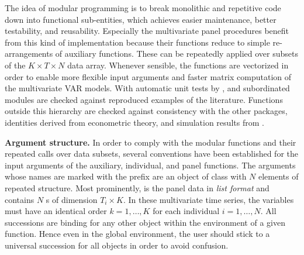 The idea of modular programming is to break monolithic and repetitive code down into functional sub-entities, which achieves easier maintenance, better testability, and reusability. Especially the multivariate panel procedures benefit from this kind of implementation because their functions reduce to simple re-arrangements of auxiliary functions. These can be repeatedly applied over subsets of the $ K \times T \times N $ data array. Whenever sensible, the  functions are vectorized in order to enable more flexible input arguments and faster matrix computation of the multivariate VAR models. With automatic unit tests by  \citep{Hadley2011}, \mbox{} and subordinated modules are checked against reproduced examples of the literature. Functions outside this hierarchy are checked against consistency with the other  packages, identities derived from econometric theory, and simulation results from \citet{EmptingEtAl2026}.


\textbf{Argument structure.} In order to comply with the modular functions and their repeated calls over data subsets, several conventions have been established for the input arguments of the auxiliary, individual, and panel functions. The arguments whose names are marked with the prefix \mbox{} are an  object of class  with $ N $ elements of repeated structure. Most prominently,  is the panel data in \textit{list format} and contains $ N $ s of dimension $ T_i \times K $. In these multivariate time series, the variables must have an identical order $ k = 1, \ldots , K $ for each individual $ i = 1,\ldots,N $. All successions are binding for any other \mbox{} object within the environment of a given function. Hence even in the global environment, the user should stick to a universal succession for all \mbox{} objects in order to avoid confusion.

